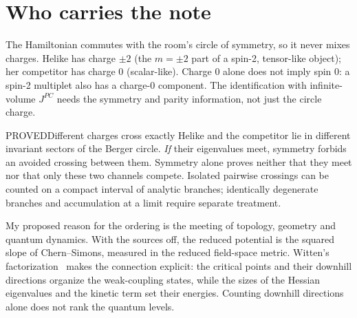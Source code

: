 \section{Who carries the note}

The Hamiltonian commutes with the room's circle of symmetry, so it never mixes charges. Helike has charge $\pm2$ (the
$m=\pm2$ part of a spin-2, tensor-like object); her competitor has charge 0 (scalar-like).
Charge 0 alone does not imply spin 0: a spin-2 multiplet also has a charge-0 component. The identification with
infinite-volume $J^{PC}$ needs the symmetry and parity information, not just the circle charge.

\begin{claim}{PROVED}{Different charges cross exactly}\label{b:cross}
Helike and the competitor lie in different invariant sectors of the Berger circle. \emph{If} their eigenvalues meet,
symmetry forbids an avoided crossing between them. Symmetry alone proves neither that they meet nor that only these
two channels compete. Isolated pairwise crossings can be counted on a compact interval of analytic branches;
identically degenerate branches and accumulation at a limit require separate treatment.
\end{claim}

 My proposed reason for the ordering is the meeting of topology, geometry and quantum dynamics. With the
sources off, the reduced potential is the squared slope of Chern--Simons, measured in the reduced field-space metric.
Witten's factorization~\cite{Witten82} makes the connection explicit: the critical points and their downhill directions
organize the weak-coupling states, while the sizes of the Hessian eigenvalues and the kinetic term set their energies.
Counting downhill directions alone does not rank the quantum levels.

